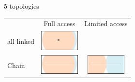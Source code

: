 \documentclass[8pt, handout=show,notes=show]{beamer}
\begin{document}
\begin{frame}{5 topologies}
	\renewcommand{\imgSize}{2cm}
	\small
	\begin{table}[h]
	\centering
		\begin{tabular}{lcc}
			&Full access&Limited access\\
			all linked&\includegraphics[width=\imgSize]{../images/5StaticEnv/environments/staticEnv0}&\\
			Chain&\includegraphics[width=\imgSize]{../images/5StaticEnv/environments/staticEnv1}&\includegraphics[width=\imgSize]{../images/5StaticEnv/environments/staticEnv2}\\

\end{tabular}
\end{table}
\end{frame}
\end{document}
